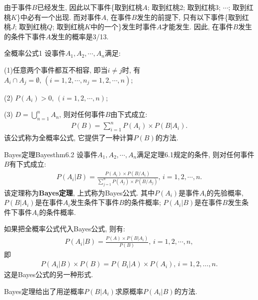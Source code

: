 \begin{result}
由于事件$B$已经发生, 因此以下事件\{取到红桃$A$; 取到红桃2; 取到红桃3; $\cdots$; 取到红桃$K$\}中必有一个出现.
而对事件$A$, 在事件$B$发生的前提下, 只有以下事件\{取到红桃$J$; 取到红桃$Q$; 取到红桃$K$中的一个\}发生时事件$A$才能发生.
因此, 在事件$B$发生的条件下事件$A$发生的概率是3/13.
\end{result}
\begin{mythm}{全概率公式}{1}
设事件$A_1,A_2,\cdots,A_n$满足:

    (1)任意两个事件都互不相容, 即当$i\neq j$时, 有$A_i\cap A_j=\emptyset,\, (i=1,2,\cdots ,n_j=1,2,\cdots ,n)$;

    (2) $P(A_i)>0,\, (i=1, 2, \cdots, n)$;

    (3) $D=\bigcup_{n=1}^{n} A_{n}$, 则对任何事件$B$由下式成立:
\begin{align}
  P(B)=\sum_{i=1}^{n} P\left(A_{i}\right) \times P\left(B | A_{i}\right).
\end{align}
该公式称为全概率公式, 它提供了一种计算$P(B)$的方法.
\end{mythm}
\begin{mythm}{Bayes定理}{Bayesthm6.2}
设事件$A_1,A_2,\cdots,A_n$满足定理6.1规定的条件, 则对任何事件$B$有下式成立:
\begin{align}
    P\left(A_{i} | B\right)=\frac{P\left(A_{i}\right) \times P\left(B / A_{i}\right)}{\sum_{j=1}^{n} P\left(A_{j}\right) \times P\left(B / A_{j}\right)},\, i=1,2, \cdots, n.
\end{align}
该定理称为\textbf{Bayes定理}, 上式称为Bayes公式. 其中$P(A_i)$是事件$A_i$的先验概率, $P(B|A_i)$是在事件$A_i$发生条件下事件$B$的条件概率; $P(A_i|B)$是在事件$B$发生条件下事件$A_i$的条件概率.
\end{mythm}

如果把全概率公式代入Bayes公式, 则有:
\begin{align}
    P\left(A_{i} | B\right)=\frac{P(A) \times P\left(B | A_{i}\right)}{P(B)},\, i=1,2, \cdots, n,
\end{align}
即
\begin{align}
    P\left(A_{i} | B\right) \times P(B)=P\left(B_{i} | A\right) \times P\left(A_{i}\right),\, i=1,2, \ldots, n.
\end{align}
这是Bayes公式的另一种形式.
\begin{remark}
    Bayes定理给出了用逆概率$P(B|A_i)$求原概率$P(A_i|B)$的方法.
\end{remark}
